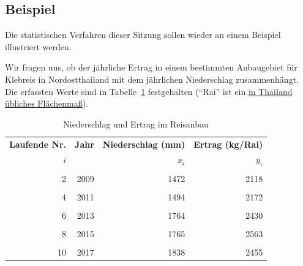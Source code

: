 \documentclass[
  11pt,
  ngerman,
  a4paper,
]{report}
\begin{document}
\hypertarget{beispiel-23}{%
\subsection{Beispiel}\label{beispiel-23}}

Die statistischen Verfahren dieser Sitzung sollen wieder an einem Beispiel illustriert werden.

Wir fragen uns, ob der jährliche Ertrag in einem bestimmten Anbaugebiet für Klebreis in Nordostthailand mit dem jährlichen Niederschlag zusammenhängt. Die erfassten Werte sind in Tabelle~\ref{tab:reis} festgehalten (\enquote{Rai} ist ein \href{https://de.wikipedia.org/wiki/Rai_(Einheit)}{in Thailand übliches Flächenmaß}).

\begin{table}

\caption{\label{tab:reis}\label{tab:reis}Niederschlag und Ertrag im Reisanbau}
\centering
\begin{tabular}[t]{rrrr}
\toprule
\multicolumn{1}{c}{\textbf{Laufende Nr.}} & \multicolumn{1}{c}{\textbf{Jahr}} & \multicolumn{1}{c}{\textbf{Niederschlag (mm)}} & \multicolumn{1}{c}{\textbf{Ertrag (kg/Rai)}} \\
\cmidrule(l{3pt}r{3pt}){1-1} \cmidrule(l{3pt}r{3pt}){2-2} \cmidrule(l{3pt}r{3pt}){3-3} \cmidrule(l{3pt}r{3pt}){4-4}
\textbf{$i$} & \textbf{} & \textbf{$x_i$} & \textbf{$y_i$}\\
\midrule
\cellcolor{gray!6}{1} & \cellcolor{gray!6}{2008} & \cellcolor{gray!6}{1449} & \cellcolor{gray!6}{1860}\\
2 & 2009 & 1472 & 2118\\
\cellcolor{gray!6}{3} & \cellcolor{gray!6}{2010} & \cellcolor{gray!6}{1607} & \cellcolor{gray!6}{2225}\\
4 & 2011 & 1494 & 2172\\
\cellcolor{gray!6}{5} & \cellcolor{gray!6}{2012} & \cellcolor{gray!6}{1390} & \cellcolor{gray!6}{1816}\\
6 & 2013 & 1764 & 2430\\
\cellcolor{gray!6}{7} & \cellcolor{gray!6}{2014} & \cellcolor{gray!6}{1767} & \cellcolor{gray!6}{2580}\\
8 & 2015 & 1765 & 2563\\
\cellcolor{gray!6}{9} & \cellcolor{gray!6}{2016} & \cellcolor{gray!6}{1671} & \cellcolor{gray!6}{2276}\\
10 & 2017 & 1838 & 2455\\
\bottomrule
\end{tabular}
\end{table}
\end{document}
